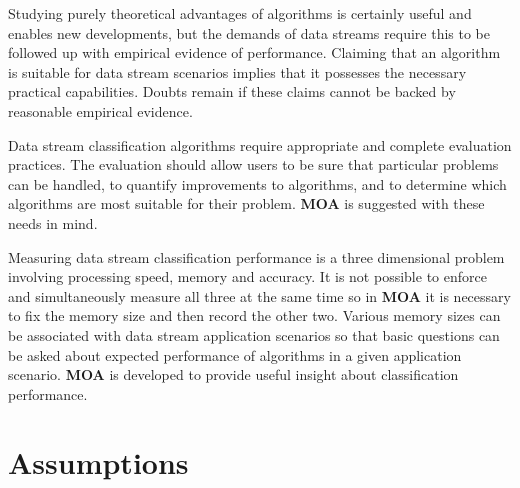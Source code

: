 Studying purely theoretical advantages of algorithms is certainly useful and enables new developments, but the demands of data streams require this to be followed up with empirical evidence of performance. Claiming that an algorithm is suitable for data stream scenarios implies that it possesses the necessary practical capabilities. Doubts remain if these claims cannot be backed by reasonable empirical evidence.

Data stream classification algorithms require appropriate and complete evaluation practices. The evaluation should allow users to be sure that particular problems can be handled, to quantify improvements to algorithms, and to determine which algorithms are most suitable for their problem. \textbf{MOA} is suggested with these needs in mind.

Measuring data stream classification performance is a three dimensional problem involving processing speed, memory and accuracy. It is not possible to enforce and simultaneously measure all three at the same time so in %
 \textbf{MOA} %
it is necessary to fix the memory size and then record the other two. Various memory sizes can be associated with data stream application scenarios so that basic questions can be asked about expected performance of algorithms in a given application scenario. \textbf{MOA} is developed to provide useful insight about classification performance.


\section{Assumptions}

